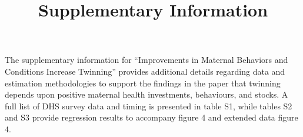 \documentclass{nature}
\title{Supplementary Information}
\begin{document}
\maketitle

\begin{linenumbers}

The supplementary information for ``Improvements in Maternal Behaviors and Conditions Increase Twinning'' provides additional details regarding data and estimation methodologies to support the findings in the paper that twinning depends upon positive maternal health investments, behaviours, and stocks.  A full list of DHS survey data and timing is presented in table S1, while tables S2 and S3 provide regression results to accompany figure 4 and extended data figure 4.



\clearpage
\begin{spacing}{1}

\begin{landscape}

\end{landscape}
\begin{landscape}

\end{landscape}
\end{spacing}



\end{linenumbers}
\end{document}
